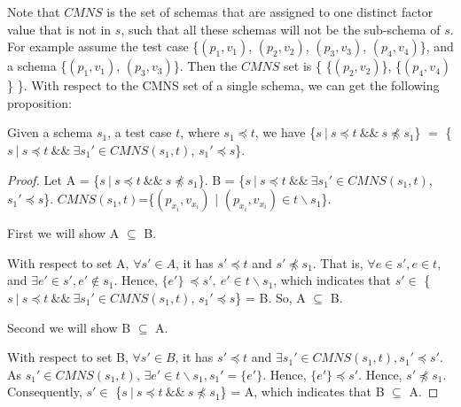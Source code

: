 Note that $CMNS$ is the set of schemas that are assigned to one distinct factor value that is not in $s$, such that all these schemas will not be the sub-schema of $s$. For example assume the test case \{$(p_{1}, v_{1})$, $(p_{2}, v_{2})$, $(p_{3}, v_{3})$, $(p_{4}, v_{4})$\}, and a schema \{$(p_{1}, v_{1})$, $(p_{3}, v_{3})$\}. Then the $CMNS$ set is \{ \{$(p_{2}, v_{2})$\}, \{$(p_{4}, v_{4})$\} \}.  With respect to the CMNS set of a single schema, we can get the following proposition:

\begin{proposition}\label{pro:superofCMNS}
Given a schema $s_{1}$, a test case $t$, where $s_{1} \preceq t$, we have \{$s\ |\ s \preceq t\ \&\&\ s \npreceq s_{1}$\} $=$  \{$ s\ |\ s \preceq t \  \&\& \ \exists s_{1}' \in CMNS(s_{1}, t)$, $s_{1}' \preceq s$\}.
\end{proposition}

\begin{proof}
Let A = \{$s\ |\ s \preceq t\ \&\&\ s \npreceq s_{1}$\}. B = \{$ s\ |\ s \preceq t \ \&\&\  \exists s_{1}' \in CMNS(s_{1}, t)$, $s_{1}' \preceq s$\}. $CMNS(s_{1},t)$=\{$(p_{x_{i}}, v_{x_{i}})$ | $(p_{x_{i}}, v_{x_{i}}) \in t \backslash s_{1} $\}.

First we will show A $\subseteq$ B.

With respect to set A, $\forall s' \in A$, it has $s' \preceq t$ and $s' \npreceq s_{1}$. That is, $\forall e \in s', e \in t$, and  $\exists e' \in s', e' \not\in s_{1}$. Hence, $\{e'\}\ \preceq s',\  e' \in t \backslash s_{1}$, which indicates that $s' \in $ \{$ s\ |\ s \preceq t \ \&\&\  \exists s_{1}' \in CMNS(s_{1}, t)$, $s_{1}' \preceq s$\} = B. So, A $\subseteq$ B.


Second we will show B $\subseteq$ A.

With respect to set B, $\forall s' \in B$, it has $s' \preceq t$  and $\exists s_{1}' \in CMNS(s_{1}, t), s_{1}' \preceq s'$. As $s_{1}' \in CMNS(s_{1}, t)$, $\exists e' \in  t \backslash s_{1}, s_{1}' = \{ e' \}$. Hence, $\{e'\} \preceq s'$. Hence, $s' \npreceq s_{1}$. Consequently, $s' \in $  \{$s\ |\ s \preceq t\ \&\&\ s \npreceq s_{1}$\} = A, which indicates that B $\subseteq$ A.

\end{proof}



